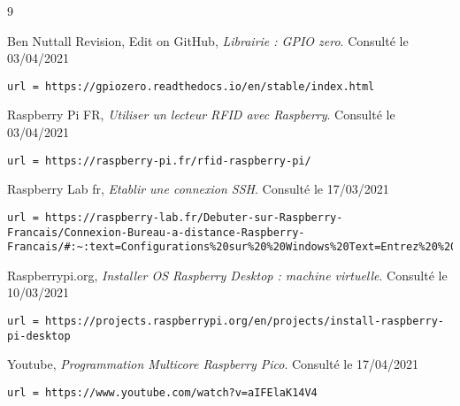 \documentclass[a4paper]{report}
\begin{document}
    
    \clearpage
    \begin{thebibliography}{9}

        \bibitem{}
            Ben Nuttall Revision, Edit on GitHub,
            \emph{Librairie : GPIO zero}. \newline
            Consulté le 03/04/2021
            \begin{verbatim}url = https://gpiozero.readthedocs.io/en/stable/index.html   
            \end{verbatim}

        \bibitem{}
            Raspberry Pi FR,
            \emph{Utiliser un lecteur RFID avec Raspberry}. \newline
            Consulté le 03/04/2021
            \begin{verbatim}url = https://raspberry-pi.fr/rfid-raspberry-pi/  
            \end{verbatim}
            
        \bibitem{}\label{bib:Connexion SSH}
            Raspberry Lab fr,
            \emph{Etablir une connexion SSH}. \newline
            Consulté le 17/03/2021
            \begin{verbatim}url = https://raspberry-lab.fr/Debuter-sur-Raspberry-Francais/Connexion-Bureau-a-distance-Raspberry-Francais/#:~:text=Configurations%20sur%20%20Windows%20Text=Entrez%20%20simplement%20%20l'adresse%20IP,pi%20%20et%20%20raspberry)%20%20et%20%20validez.  
            \end{verbatim}
            
         \bibitem{}\label{bib:raspebrry_os}
            Raspberrypi.org,
            \emph{Installer OS Raspberry Desktop : machine virtuelle}. \newline
            Consulté le 10/03/2021
            \begin{verbatim}url = https://projects.raspberrypi.org/en/projects/install-raspberry-pi-desktop  
            \end{verbatim}
            
         \bibitem{}\label{bib:multicore_pico}
            Youtube,
            \emph{Programmation Multicore Raspberry Pico}. \newline
            Consulté le 17/04/2021
            \begin{verbatim}url = https://www.youtube.com/watch?v=aIFElaK14V4  
            \end{verbatim}

    \end{thebibliography}
\end{document}
